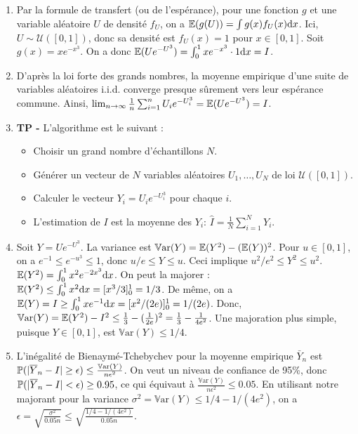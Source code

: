 \documentclass[solutions]{exercices}
\begin{document}
\begin{solution}
\begin{enumerate}
  \item Par la formule de transfert (ou de l'espérance), pour une fonction $g$ et une variable aléatoire $U$ de densité $f_U$, on a $\E(g(U)) = \int g(x) f_U(x) \dd x$.
  Ici, $U \sim \mathcal{U}([0,1])$, donc sa densité est $f_U(x) = 1$ pour $x \in [0,1]$. Soit $g(x) = x e^{-x^3}$.
  On a donc $\E(U e^{-U^3}) = \int_0^1 x e^{-x^3} \cdot 1 \dd x = I$.
  \item D'après la loi forte des grands nombres, la moyenne empirique d'une suite de variables aléatoires i.i.d. converge presque sûrement vers leur espérance commune.
  Ainsi, $\lim_{n \to \infty} \frac{1}{n} \sum_{i=1}^n U_i e^{-U_i^3} = \E(U e^{-U^3}) = I$.
  \item \textbf{TP -} L'algorithme est le suivant :
  \begin{itemize}
    \item Choisir un grand nombre d'échantillons $N$.
    \item Générer un vecteur de $N$ variables aléatoires $U_1, \dots, U_N$ de loi $\mathcal{U}([0,1])$.
    \item Calculer le vecteur $Y_i = U_i e^{-U_i^3}$ pour chaque $i$.
    \item L'estimation de $I$ est la moyenne des $Y_i$: $\hat{I} = \frac{1}{N} \sum_{i=1}^N Y_i$.
  \end{itemize}
  \item Soit $Y = Ue^{-U^3}$. La variance est $\mathbb{V}\mathrm{ar}(Y) = \E(Y^2) - (\E(Y))^2$.
  Pour $u \in [0,1]$, on a $e^{-1} \leq e^{-u^3} \leq 1$, donc $u/e \le Y \le u$.
  Ceci implique $u^2/e^2 \leq Y^2 \leq u^2$.
  $\E(Y^2) = \int_0^1 x^2 e^{-2x^3} \dd x$. On peut la majorer : $\E(Y^2) \le \int_0^1 x^2 \dd x = [x^3/3]_0^1 = 1/3$.
  De même, on a $\E(Y) = I \ge \int_0^1 x e^{-1} \dd x = [x^2/(2e)]_0^1 = 1/(2e)$.
  Donc, $\mathbb{V}\mathrm{ar}(Y) = \E(Y^2) - I^2 \leq \frac{1}{3} - (\frac{1}{2e})^2 = \frac{1}{3} - \frac{1}{4e^2}$. Une majoration plus simple, puisque $Y \in [0,1]$, est $\mathbb{V}\mathrm{ar}(Y) \le 1/4$.
  \item L'inégalité de Bienaymé-Tchebychev pour la moyenne empirique $\bar{Y}_n$ est $\P(|\bar{Y}_n - I| \geq \epsilon) \leq \frac{\mathbb{V}\mathrm{ar}(Y)}{n\epsilon^2}$.
  On veut un niveau de confiance de 95\%, donc $\P(|\bar{Y}_n - I| < \epsilon) \geq 0.95$, ce qui équivaut à $\frac{\mathbb{V}\mathrm{ar}(Y)}{n\epsilon^2} \leq 0.05$.
  En utilisant notre majorant pour la variance $\sigma^2 = \mathbb{V}\mathrm{ar}(Y) \le 1/4 - 1/(4e^2)$, on a $\epsilon = \sqrt{\frac{\sigma^2}{0.05 n}} \le \sqrt{\frac{1/4-1/(4e^2)}{0.05n}}$.

\end{enumerate}
\end{solution}
\end{document}
